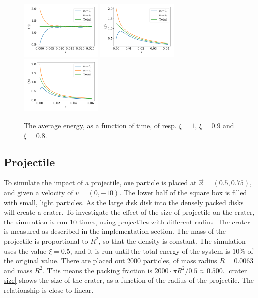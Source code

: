 \documentclass{article}
\begin{document}
    \begin{figure}[H]
        \centering
        \hspace{-5mm}
        \includegraphics[width=0.35\textwidth]{../plots/problem3/xi_0/energy_ex3.pdf}
        \hspace{-4mm}
        \includegraphics[width=0.35\textwidth]{../plots/problem3/xi_1/energy_ex3.pdf}
        \hspace{-4mm}
        \includegraphics[width=0.35\textwidth]{../plots/problem3/xi_2/energy_ex3.pdf}
        \hspace{-5mm}
        \caption{The average energy, as a function of time, of resp.
        $\xi=1$, $\xi=0.9$ and $\xi=0.8$.}
        \label{problem2 av en}
    \end{figure}

    \subsection*{Projectile}
    To simulate the impact of a projectile, one particle is placed at $\vec x = (0.5, 0.75)$, and given a velocity of $v = (0, -10)$.
    The lower half of the square box is filled with small, light particles.
    As the large disk  disk into the densely packed disks will create a crater.
    To investigate the effect of the size of projectile on the crater, the simulation is run 10 times, using projectiles with different radius.
    The crater is measured as described in the implementation section.
    The mass of the projectile is proportional to $R^2$, so that the density is constant.
    The simulation uses the value $\xi = 0.5$, and it is run until the total energy of the system is $10\%$ of the original value.
    There are placed out 2000 particles, of mass radius $R=0.0063$ and mass $R^2$.
    This means the packing fraction is $2000 \cdot \pi R^2 / 0.5 \approx 0.500$.
    \autoref{crater size} shows the size of the crater, as a function of the radius of the projectile.
    The relationship is close to linear.
\end{document}
